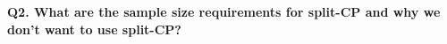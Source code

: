 \documentclass{article}
\begin{document}
%
%
%
%


\textbf{Q2. What are the sample size requirements for split-CP and why we don't want to use split-CP?}\\
\end{document}
